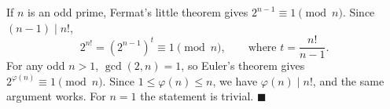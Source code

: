 If $n$ is an odd prime, Fermat's little theorem gives $2^{n-1}\equiv1\pmod n$. Since $(n-1)\mid n!$,
\[2^{n!}=\left(2^{n-1}\right)^{t}\equiv1\pmod n,\qquad\text{where }t=\dfrac{n!}{n-1}.\]
For any odd $n>1$, $\gcd(2,n)=1$, so Euler's theorem gives $2^{\varphi(n)}\equiv1\pmod n$. Since $1\le\varphi(n)\le n$, we have $\varphi(n)\mid n!$, and the same argument works. For $n=1$ the statement is trivial. $\blacksquare$
